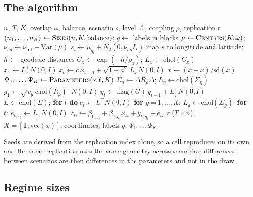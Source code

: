 \subsection{The algorithm}

\begin{algorithm}[H]
\caption{One replication of the design}\label{alg:dgp}
\begin{algorithmic}[1]
\Require $n$, $T$, $K$, overlap $\omega$, balance, scenario $s$, level $\ell$, coupling $\rho$, replication $r$
\State $(n_1,\dots,n_K) \gets \textsc{Sizes}(n, K, \text{balance})$; \; $g \gets$ labels in blocks
\State $\mu \gets \textsc{Centres}(K, \omega)$;\quad $\nu_{sp} \gets \nu_{\mathrm{tot}} - \mathrm{Var}(\mu)$
 \; $s_i \gets \mu_{g_i} + N_2(0, \nu_{sp} I_2)$ \EndFor
\State map $s$ to longitude and latitude; \; $h \gets$ geodesic distances
\State $C_x \gets \exp(-h/\rho_x)$; \; $L_x \gets \mathrm{chol}(C_x)$
\State $x_1 \gets L_x^\top N(0,I)$
 \; $x_t \gets a\,x_{t-1} + \sqrt{1-a^2}\, L_x^\top N(0,I)$ \EndFor
\State $x \gets (x - \bar x)/\mathrm{sd}(x)$
\State $\Psi_1,\dots,\Psi_K \gets \textsc{Parameters}(s, \ell, K)$ 
\State $\Sigma_\eta \gets \Delta R_\rho \Delta$; \; $L_\eta \gets \mathrm{chol}(\Sigma_\eta)$
\State $y_1 \gets \sqrt{\bar v_y}\,\mathrm{chol}(R_\rho)^\top N(0,I)$
 \; $y_t \gets \mathrm{diag}(G)\, y_{t-1} + L_\eta^\top N(0,I)$ \EndFor
{}
  \State $L \gets \mathrm{chol}(\Sigma)$; \; \textbf{for} $t$ \textbf{do} $e_t \gets L^\top N(0,I)$
\Else
  \State \textbf{for} $g = 1,\dots,K$: $L_g \gets \mathrm{chol}(\Sigma_g)$; \textbf{for} $t$: $e_{t,I_g} \gets L_g^\top N(0,I)$
\EndIf
{}
  \State $z_{ti} \gets \beta_{0,g_i} + \beta_{1,g_i} x_{ti} + y_{t,g_i} + e_{ti}$
\EndFor
\Ensure $z$ ($T \times n$), $X = [\mathbf{1}, \mathrm{vec}(x)]$, coordinates, labels $g$, $\Psi_1,\dots,\Psi_K$
\end{algorithmic}
\end{algorithm}

Seeds are derived from the replication index alone, so a cell reproduces on its own and the same replication uses the same geometry across scenarios: differences between scenarios are then differences in the parameters and not in the draw.

\subsection{Regime sizes}

